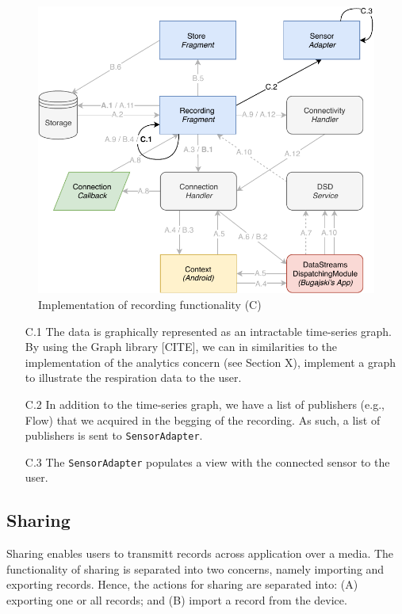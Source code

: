 \begin{figure}
    \centering
    \includegraphics[scale=0.7]{images/Recording_ImpC.pdf}
    \caption{Implementation of recording functionality (C)}
    \label{fig:impl_recordingC}
\end{figure}

\begin{itemize}
    \item[C.1] The data is graphically represented as an intractable time-series graph. By using the Graph library [CITE], we can in similarities to the implementation of the analytics concern (see Section X), implement a graph to illustrate the respiration data to the user.
    \item[C.2] In addition to the time-series graph, we have a list of publishers (e.g., Flow) that we acquired in the begging of the recording. As such, a list of publishers is sent to \verb|SensorAdapter|. 
    \item[C.3] The \verb|SensorAdapter| populates a view with the connected sensor to the user.
\end{itemize}


\subsection{Sharing}

Sharing enables users to transmitt records across application over a media. The functionality of sharing is separated into two concerns, namely importing and exporting records. Hence, the actions for sharing are separated into: (A) exporting one or all records; and (B) import a record from the device. 

